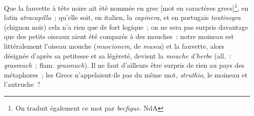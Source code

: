 \documentclass[french,twoside]{book} %
\begin{document}
\noindent Que la fauvette à tête noire ait été nommée en grec [mot en caractères grecs]\footnote{ On traduit également ce mot par {\itshape becfigue}. NdA}, en latin {\itshape atracapilla} ; qu’elle soit, en italien, la {\itshape capinera}, et en portugais {\itshape toutinegra} (chignon noir) cela n’a rien que de fort logique ; on ne sera pas surpris davantage que des petits oiseaux aient été comparés à des mouches : notre moineau est littéralement l’oiseau mouche ({\itshape muscionem}, de {\itshape musca}) et la fauvette, alors désignée d’après sa petitesse et sa légèreté, devient la {\itshape mouche d’herbe} (all. : {\itshape grasmuch} ; flam. {\itshape grasmuch}). Il ne faut d’ailleurs être surpris de rien au pays des métaphores ; les Grecs n’appelaient-ils pas du même mot, {\itshape struthio}, le moineau et l’autruche ?\par
\end{document}

